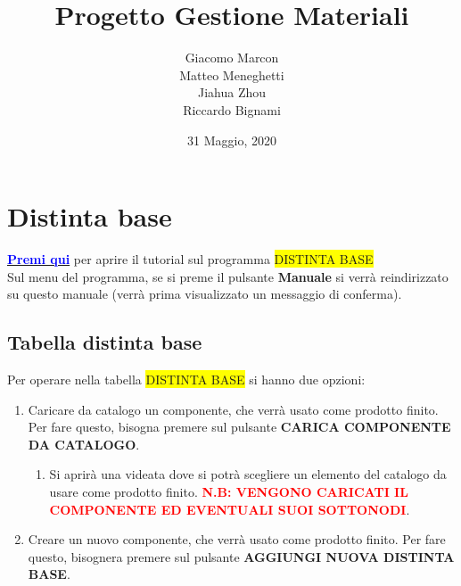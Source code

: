 \documentclass[12pt,twoside]{report}
\newcommand{\coloredbold}[2]{\textcolor{#1}{\textbf{#2}}}
\begin{document}
\title{Progetto Gestione Materiali}
\author
{
	Giacomo Marcon
	\\ Matteo Meneghetti  
	\\ Jiahua Zhou
	\\ Riccardo Bignami
}
\date{31 Maggio, 2020}
\maketitle

\newpage
\tableofcontents{}  

\chapter{Distinta base}   

\href{https://drive.google.com/file/d/1uhCLJQT8CLmh1zFzK5Ff-jDEkEGrC3Ny/view?usp=sharing}{\coloredbold{blue}{Premi qui}} per aprire il tutorial sul programma \colorbox{yellow}{DISTINTA BASE}\\

Sul menu del programma, se si preme il pulsante \textbf{Manuale} si verrà reindirizzato su questo manuale (verrà prima visualizzato un messaggio di conferma).


\section{Tabella distinta base}

Per operare nella tabella \colorbox{yellow}{DISTINTA BASE} si hanno due opzioni: 

\begin{enumerate}
	
	\item Caricare da catalogo un componente, che verrà usato come prodotto finito. Per fare questo, bisogna premere sul pulsante \textbf{CARICA COMPONENTE DA CATALOGO}.
	      	
	      \begin{enumerate}
	      	
	      	\item Si aprirà una videata dove si potrà scegliere un elemento del catalogo da usare come prodotto finito.
	      	      \coloredbold{red}{N.B: VENGONO CARICATI IL COMPONENTE ED EVENTUALI SUOI SOTTONODI}.
	      	      
	      \end{enumerate}
	      
	\item Creare un nuovo componente, che verrà usato come prodotto finito. Per fare questo, bisognera premere sul pulsante \textbf{AGGIUNGI NUOVA DISTINTA BASE}.
	      	
\end{enumerate}
\end{document}
